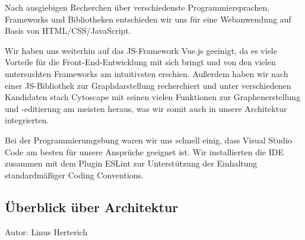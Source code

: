 \documentclass[twoside]{report}
\begin{document}
Nach ausgiebigen Recherchen über verschiedenste Programmiersprachen, Frameworks und Bibliotheken entschieden wir uns für eine Webanwendung auf Basis von HTML/CSS/JavaScript.

Wir haben uns weiterhin auf das JS-Framework Vue.js geeinigt, da es viele Vorteile für die Front-End-Entwicklung mit sich bringt und von den vielen untersuchten Frameworks am intuitivsten erschien. Außerdem haben wir nach einer JS-Bibliothek zur Graphdarstellung recherchiert und unter verschiedenen Kandidaten stach Cytoscape mit seinen vielen Funktionen zur Graphenerstellung und -editierung am meisten heraus, was wir somit auch in unsere Architektur integrierten.

Bei der Programmierumgebung waren wir uns schnell einig, dass Visual Studio Code am besten für unsere Ansprüche geeignet ist. Wir installierten die IDE zusammen mit dem Plugin ESLint zur Unterstützung der Einhaltung standardmäßiger Coding Conventions.

\subsection{Überblick über Architektur}
{\small Autor: Linus Herterich}
\end{document}
